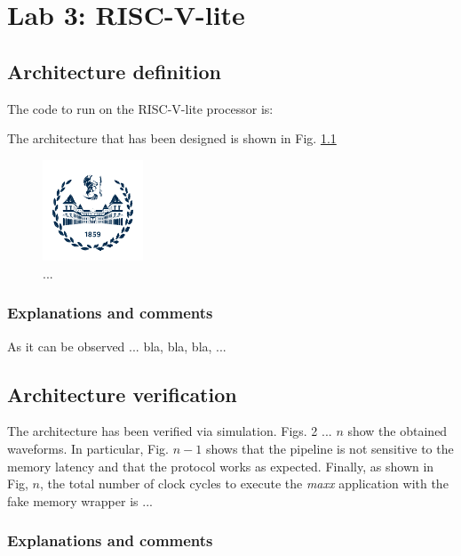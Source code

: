 \chapter{Lab 3: RISC-V-lite}


\section{Architecture definition}

The code to run on the RISC-V-lite processor is:

\begin{listato}
  
\end{listato}

The architecture that has been designed is shown in Fig. \ref{fig:lab3:fig1}

\begin{figure}[h]
  \centering
  \includegraphics[width=3cm]{./logopoli_new}
  \caption{...}
  \label{fig:lab3:fig1}
\end{figure}

\subsection{Explanations and comments}

As it can be observed ... bla, bla, bla, ...

\section{Architecture verification}

The architecture has been verified via simulation. Figs. 2 ... $n$ show the obtained waveforms.
In particular, Fig. $n-1$ shows that the pipeline is not sensitive to the memory latency and that the protocol works as expected.
Finally, as shown in Fig, $n$, the total number of clock cycles to execute the \emph{maxx} application with the fake memory wrapper is ...

\subsection{Explanations and comments}

